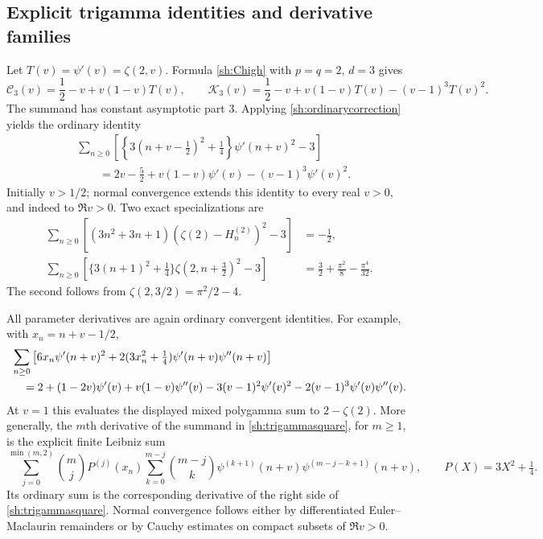 \subsection{Explicit trigamma identities and derivative families}

Let $T(v)=\psi'(v)=\zeta(2,v)$.  Formula \eqref{sh:Chigh} with
$p=q=2$, $d=3$ gives
\[
 \mathcal C_3(v)=\frac12-v+v(1-v)T(v),\qquad
 \mathcal K_3(v)=\frac12-v+v(1-v)T(v)-(v-1)^3T(v)^2.
\]
The summand has constant asymptotic part $3$.  Applying
\eqref{sh:ordinarycorrection} yields the ordinary identity
\begin{equation}\label{sh:trigammasquare}
 \boxed{\begin{aligned}
 &\sum_{n\ge0}\left[
    \left\{3(n+v-\tfrac12)^2+\tfrac14\right\}
                     \psi'(n+v)^2-3\right]\\
 &\qquad=2v-\frac52+v(1-v)\psi'(v)
                         -(v-1)^3\psi'(v)^2.
 \end{aligned}}
\end{equation}
Initially $v>1/2$; normal convergence extends this identity to every
real $v>0$, and indeed to $\Re v>0$.  Two exact specializations are
\begin{align}
 \sum_{n\ge0}\left[
       (3n^2+3n+1)(\zeta(2)-H_n^{(2)})^2-3\right]
       &=-\frac12,\label{sh:unshiftedsquare}\\
 \sum_{n\ge0}\left[
       \{3(n+1)^2+\tfrac14\}\zeta(2,n+\tfrac32)^2-3\right]
       &=\frac32+\frac{\pi^2}{8}-\frac{\pi^4}{32}.
       \label{sh:halflatticesquare}
\end{align}
The second follows from $\zeta(2,3/2)=\pi^2/2-4$.

All parameter derivatives are again ordinary convergent identities.
For example, with $x_n=n+v-1/2$,
\begin{align}\label{sh:squarederivative}
 &\sum_{n\ge0}\left[
  6x_n\psi'(n+v)^2
  +2(3x_n^2+\tfrac14)\psi'(n+v)\psi''(n+v)\right]\notag\\
 &\quad=2+(1-2v)\psi'(v)+v(1-v)\psi''(v)
      -3(v-1)^2\psi'(v)^2
      -2(v-1)^3\psi'(v)\psi''(v).
\end{align}
At $v=1$ this evaluates the displayed mixed polygamma sum to
$2-\zeta(2)$.  More generally, the $m$th derivative of the summand
in \eqref{sh:trigammasquare}, for $m\ge1$, is the explicit finite
Leibniz sum
\[
 \sum_{j=0}^{\min(m,2)}\binom mj P^{(j)}(x_n)
    \sum_{k=0}^{m-j}\binom{m-j}{k}
       \psi^{(k+1)}(n+v)\psi^{(m-j-k+1)}(n+v),
 \qquad P(X)=3X^2+\tfrac14.
\]
Its ordinary sum is the corresponding derivative of the right side
of \eqref{sh:trigammasquare}.  Normal convergence follows either
by differentiated Euler--Maclaurin remainders or by Cauchy estimates
on compact subsets of $\Re v>0$.

